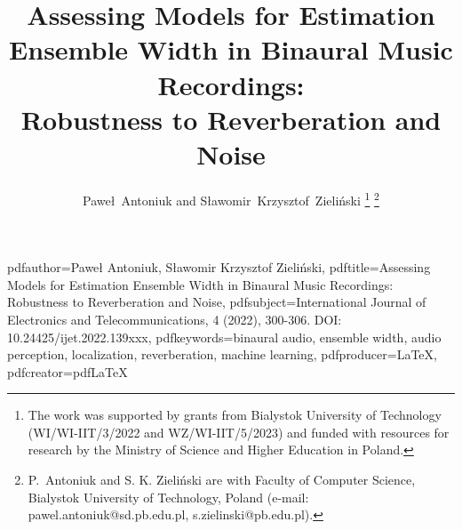 

\hypersetup
{pdfauthor={Paweł Antoniuk, Sławomir Krzysztof Zieliński},%
pdftitle={Assessing Models for Estimation Ensemble Width in Binaural Music Recordings: Robustness to Reverberation and Noise},%
pdfsubject={International Journal of Electronics and Telecommunications, 4 (2022), 300-306. DOI: 10.24425/ijet.2022.139xxx},%
pdfkeywords={binaural audio, ensemble width, audio perception, localization, reverberation, machine learning},%
pdfproducer={LaTeX},%
pdfcreator={pdfLaTeX}
}



%

\title{\vspace{1cm} Assessing Models for Estimation Ensemble Width in Binaural Music Recordings: \\ Robustness to Reverberation and Noise}
%
%
%

\author{Paweł~Antoniuk and Sławomir~Krzysztof~Zieliński%
\thanks{The work was supported by grants from Bialystok University of Technology (WI/WI-IIT/3/2022 and WZ/WI-IIT/5/2023) and funded with resources for research by the Ministry of Science and Higher Education in Poland.}%
\thanks{P.~Antoniuk and S. K. Zieliński are with Faculty of Computer Science, Bialystok University of Technology, Poland (e-mail: pawel.antoniuk@sd.pb.edu.pl, s.zielinski@pb.edu.pl).}%
}

